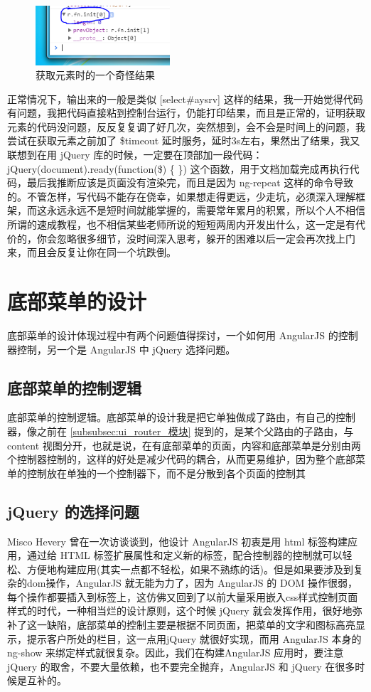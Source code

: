     \begin{figure}[H]
      \centering
      \includegraphics[width=5cm]{./img/total_price_bug.PNG}
      \caption{获取元素时的一个奇怪结果}
      \label{fig:total_price_bug}
    \end{figure}
    正常情况下，输出来的一般是类似 [select\#aysrv] 这样的结果，我一开始觉得代码有问题，我把代码直接粘到控制台运行，仍能打印结果，而且是正常的，证明获取元素的代码没问题，反反复复调了好几次，突然想到，会不会是时间上的问题，我尝试在获取元素之前加了 \$timeout 延时服务，延时3s左右，果然出了结果，我又联想到在用 jQuery 库的时候，一定要在顶部加一段代码：jQuery(document).ready(function(\$) \{ \}) 这个函数，用于文档加载完成再执行代码，最后我推断应该是页面没有渲染完，而且是因为 ng-repeat 这样的命令导致的。不管怎样，写代码不能存在侥幸，如果想走得更远，少走坑，必须深入理解框架，而这永远永远不是短时间就能掌握的，需要常年累月的积累，所以个人不相信所谓的速成教程，也不相信某些老师所说的短短两周内开发出什么，这一定是有代价的，你会忽略很多细节，没时间深入思考，躲开的困难以后一定会再次找上门来，而且会反复让你在同一个坑跌倒。

\section{底部菜单的设计}
  \label{sec:底部菜单的设计}
    底部菜单的设计体现过程中有两个问题值得探讨，一个如何用 AngularJS 的控制器控制，另一个是 AngularJS 中 jQuery 选择问题。

    \subsection{底部菜单的控制逻辑}
      \label{subsec:底部菜单的控制逻辑}
        底部菜单的控制逻辑。底部菜单的设计我是把它单独做成了路由，有自己的控制器，像之前在 \ref{subsubsec:ui_router_模块} 提到的，是某个父路由的子路由，与 content 视图分开，也就是说，在有底部菜单的页面，内容和底部菜单是分别由两个控制器控制的，这样的好处是减少代码的耦合，从而更易维护，因为整个底部菜单的控制放在单独的一个控制器下，而不是分散到各个页面的控制其
    \subsection{jQuery 的选择问题}
      \label{subsec:jquery_的选择问题}
        Misco Hevery 曾在一次访谈谈到，他设计 AngularJS 初衷是用 html 标签构建应用，通过给 HTML 标签扩展属性和定义新的标签，配合控制器的控制就可以轻松、方便地构建应用(其实一点都不轻松，如果不熟练的话)。但是如果要涉及到复杂的dom操作，AngularJS 就无能为力了，因为 AngularJS 的 DOM 操作很弱，每个操作都要插入到标签上，这仿佛又回到了以前大量采用嵌入css样式控制页面样式的时代，一种相当烂的设计原则，这个时候 jQuery 就会发挥作用，很好地弥补了这一缺陷，底部菜单的控制主要是根据不同页面，把菜单的文字和图标高亮显示，提示客户所处的栏目，这一点用jQuery 就很好实现，而用 AngularJS 本身的 ng-show 来绑定样式就很复杂。因此，我们在构建AngularJS 应用时，要注意 jQuery 的取舍，不要大量依赖，也不要完全抛弃，AngularJS 和 jQuery 在很多时候是互补的。

